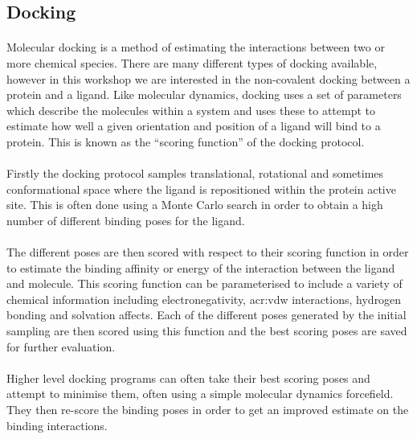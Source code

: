 \subsection{Docking}
    \paragraph{}
        Molecular docking is a method of estimating the interactions between two or more chemical species. There are many different types of docking available, however in this workshop we are interested in the non-covalent docking between a protein and a ligand. Like molecular dynamics, docking uses a set of parameters which describe the molecules within a system and uses these to attempt to estimate how well a given orientation and position of a ligand will bind to a protein. This is known as the \enquote{scoring function} of the docking protocol. 
        
    \paragraph{}
Firstly the docking protocol samples translational, rotational and sometimes conformational space where the ligand is repositioned within the protein active site. This is often done using a Monte Carlo search in order to obtain a high number of different binding poses for the ligand.

    \paragraph{}
        The different poses are then scored with respect to their scoring function in order to estimate the binding affinity or energy of the interaction between the ligand and molecule. This scoring function can be parameterised to include a variety of chemical information including electronegativity, \gls{acr:vdw} interactions, hydrogen bonding and solvation affects. Each of the different poses generated by the initial sampling are then scored using this function and the best scoring poses are saved for further evaluation. 

    \paragraph{}
        Higher level docking programs can often take their best scoring poses and attempt to minimise them, often using a simple molecular dynamics forcefield. They then re-score the binding poses in order to get an improved estimate on the binding interactions.
    

